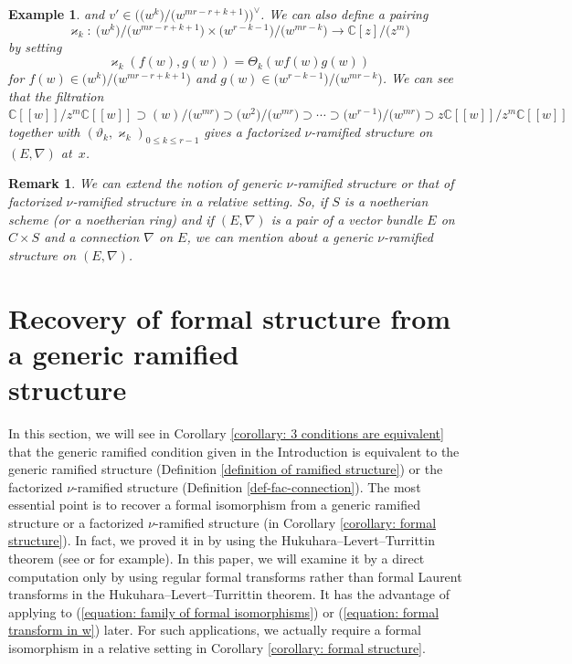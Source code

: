 \documentclass[pdftex]{sigma}
\numberwithin{equation}{section}
\newtheorem{Example}[Theorem]{Example}
\newtheorem{Remark}[Theorem]{Remark}
\begin{document}
\begin{Example}
and $v'\!\in\! \big(\big(w^k\big)/\big(w^{mr-r+k+1}\big)\big)^{\vee}\!$.
We can also define a pairing
\[
 \varkappa_k\colon \
 \big(w^k\big)/\big(w^{mr-r+k+1}\big) \times \big(w^{r-k-1}\big)/\big(w^{mr-k}\big)
 \longrightarrow \mathbb{C}[z]/\big(z^m\big)
\]
by setting
\[
 \varkappa_k(f(w),g(w))=\Theta_k(wf(w)g(w))
\]
for $f(w)\in \big(w^k\big)/\big(w^{mr-r+k+1}\big)$ and
$g(w)\in \big(w^{r-k-1}\big)/\big(w^{mr-k}\big)$.
We can see that the filtration
$\mathbb{C}[[w]]/z^m\mathbb{C}[[w]]
\supset (w)/\big(w^{mr}\big)\supset \big(w^2\big)/\big(w^{mr}\big)
\supset\cdots\supset \big(w^{r-1}\big)/\big(w^{mr}\big)
\supset z\mathbb{C}[[w]]/z^m\mathbb{C}[[w]]$
together with $(\vartheta_k,\varkappa_k)_{0\leq k\leq r-1}$
gives a factorized $\nu$-ramified structure
on $(E,\nabla)$ at~$x$.
\end{Example}

\begin{Remark}We can extend the notion of generic $\nu$-ramified structure
or that of factorized $\nu$-ramified structure in a relative setting.
So, if $S$ is a noetherian scheme (or a noetherian ring) and
if $(E,\nabla)$ is a pair of a vector bundle $E$ on $C\times S$
and a connection $\nabla$ on $E$,
we can mention about a generic $\nu$-ramified structure
on $(E,\nabla)$.
\end{Remark}

\section[Recovery of formal structure from a generic ramified structure]{Recovery of formal structure from a generic ramified\\ structure}
\label{section: recovery of formal structure}

In this section, we will see in Corollary \ref{corollary: 3 conditions are equivalent}
that the generic ramified condition
given in the Introduction
is equivalent to the generic ramified structure
(Definition \ref{definition of ramified structure})
or the factorized $\nu$-ramified structure
(Definition \ref{def-fac-connection}).
The most essential point is to recover a formal isomorphism
from a generic ramified structure or a factorized $\nu$-ramified structure
(in Corollary \ref{corollary: formal structure}).
In fact, we proved it in \cite[Proposition 1.3]{Inaba-2}
by using the Hukuhara--Levert--Turrittin theorem
(see \cite[Proposition 1.4.1]{Babbitt-Varadarajan} or \cite[Theorem 6.8.1]{Sibuya} for example).
In this paper, we will examine it by a direct computation only by using regular formal transforms
rather than formal Laurent transforms in the Hukuhara--Levert--Turrittin theorem.
It has the advantage of applying to (\ref{equation: family of formal isomorphisms})
or (\ref{equation: formal transform in w}) later.
For such applications, we actually require a formal isomorphism in a relative setting
in Corollary \ref{corollary: formal structure}.
\end{document}
